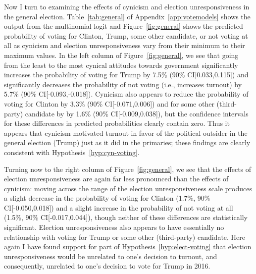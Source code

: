 \documentclass[12pt]{article}
\begin{document}
Now I turn to examining the effects of cynicism and election unresponsiveness in the general election. Table~\ref{tab:general} of Appendix~\ref{app:votemodels} shows the output from the multinomial logit and Figure~\ref{fig:general} shows the predicted probability of voting for Clinton, Trump, some other candidate, or not voting at all as cynicism and election unresponsiveness vary from their minimum to their maximum values. In the left column of Figure~\ref{fig:general}, we see that going from the least to the most cynical attitudes towards government significantly increases the probability of voting for Trump by 7.5\% (90\% CI[0.033,0.115]) and significantly decreases the probability of not voting (i.e., increases turnout) by 5.7\% (90\% CI[-0.093,-0.018]). Cynicism also appears to reduce the probability of voting for Clinton by 3.3\% (90\% CI[-0.071,0.006]) and for some other (third-party) candidate by by 1.6\% (90\% CI[-0.009,0.038]), but the confidence intervals for these differences in predicted probabilities clearly contain zero. Thus it appears that cynicism motivated turnout in favor of the political outsider in the general election (Trump) just as it did in the primaries; these findings are clearly consistent with Hypothesis~\ref{hyp:cyn-voting}.

Turning now to the right column of Figure~\ref{fig:general}, we see that the effects of election unresponsiveness are again far less pronounced than the effects of cynicism: moving across the range of the election unresponsiveness scale produces a slight decrease in the probability of voting for Clinton (1.7\%, 90\% CI[-0.050,0.018]) and a slight increase in the probability of not voting at all (1.5\%, 90\% CI[-0.017,0.044]), though neither of these differences are statistically significant. Election unresponsiveness also appears to have essentially no relationship with voting for Trump or some other (third-party) candidate. Here again I have found support for part of Hypothesis~\ref{hyp:elect-voting} that election unresponsiveness would be unrelated to one's decision to turnout, and consequently, unrelated to one's decision to vote for Trump in 2016. 
\end{document}
